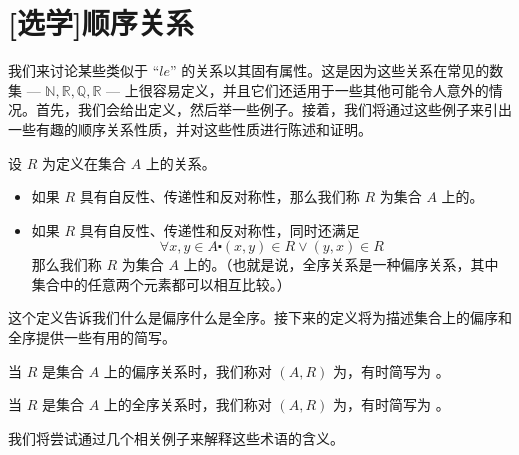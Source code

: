 \section[顺序关系]{[选学]顺序关系}\label{sec:section6.3}

我们来讨论某些类似于 ``$le$'' 的关系以其固有属性。这是因为这些关系在常见的数集 --- $\mathbb{N}, \mathbb{R}, \mathbb{Q}, \mathbb{R}$ --- 上很容易定义，并且它们还适用于一些其他可能令人意外的情况。首先，我们会给出定义，然后举一些例子。接着，我们将通过这些例子来引出一些有趣的顺序关系性质，并对这些性质进行陈述和证明。

\begin{definition}
    设 $R$ 为定义在集合 $A$ 上的关系。

    \begin{itemize}
        \item 如果 $R$ 具有自反性、传递性和反对称性，那么我们称 $R$ 为集合 $A$ 上的。
        \item 如果 $R$ 具有自反性、传递性和反对称性，同时还满足
        \[\forall x, y \in A \centerdot (x, y) \in R \lor (y, x) \in R\]
        那么我们称 $R$ 为集合 $A$ 上的。（也就是说，全序关系是一种偏序关系，其中集合中的任意两个元素都可以相互比较。）
    \end{itemize}
\end{definition}

这个定义告诉我们什么是偏序什么是全序。接下来的定义将为描述集合上的偏序和全序提供一些有用的简写。

\begin{definition}
    当 $R$ 是集合 $A$ 上的偏序关系时，我们称对 $(A, R)$ 为，有时简写为  。

    当 $R$ 是集合 $A$ 上的全序关系时，我们称对 $(A, R)$ 为，有时简写为  。
\end{definition}

我们将尝试通过几个相关例子来解释这些术语的含义。\\


